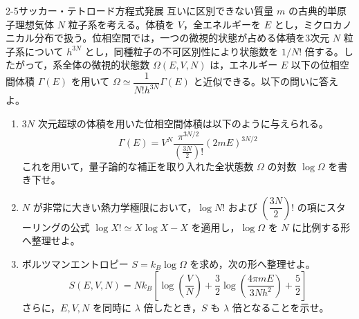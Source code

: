 
\begin{mondai}{2-5}{サッカー・テトロード方程式}{発展}
互いに区別できない質量 $m$ の古典的単原子理想気体 $N$ 粒子系を考える。体積を $V$，全エネルギーを $E$ とし，ミクロカノニカル分布で扱う。位相空間では，一つの微視的状態が占める体積を3次元 $N$ 粒子系について $h^{3N}$ とし，同種粒子の不可区別性により状態数を $1/N!$ 倍する。したがって，系全体の微視的状態数 $\Omega(E, V, N)$ は，エネルギー $E$ 以下の位相空間体積 $\Gamma(E)$ を用いて $\Omega \simeq \dfrac{1}{N! h^{3N}} \Gamma(E)$ と近似できる。以下の問いに答えよ。

\begin{enumerate}
  \item $3N$ 次元超球の体積を用いた位相空間体積は以下のように与えられる。
  \begin{equation*}
  \Gamma(E) = V^N \frac{\pi^{3N/2}}{\left(\frac{3N}{2}\right)!} (2mE)^{3N/2}
  \end{equation*}
  これを用いて，量子論的な補正を取り入れた全状態数 $\Omega$ の対数 $\log \Omega$ を書き下せ。

  \item $N$ が非常に大きい熱力学極限において，$\log N!$ および $\left(\dfrac{3N}{2}\right)!$ の項にスターリングの公式 $\log X! \simeq X \log X - X$ を適用し，$\log \Omega$ を $N$ に比例する形へ整理せよ。

  \item ボルツマンエントロピー $S = k_B \log \Omega$ を求め，次の形へ整理せよ。
  \begin{equation*}
  S(E,V,N)=Nk_B\left[\log\left(\frac{V}{N}\right)
  +\frac{3}{2}\log\left(\frac{4\pi mE}{3Nh^2}\right)+\frac{5}{2}\right]
  \end{equation*}
  さらに，$E,V,N$ を同時に $\lambda$ 倍したとき，$S$ も $\lambda$ 倍となることを示せ。
\end{enumerate}
\end{mondai}

